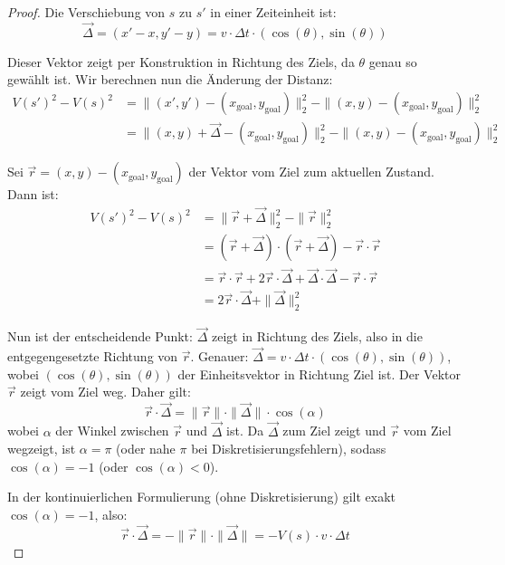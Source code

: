 ﻿\documentclass[a4paper,12pt]{article}
\theoremstyle{definition}
\begin{document}
\begin{proof}
Die Verschiebung von $s$ zu $s'$ in einer Zeiteinheit ist:
\begin{equation}
\vec{\Delta} = (x' - x, y' - y) = v \cdot \Delta t \cdot (\cos(\theta), \sin(\theta))
\end{equation}

Dieser Vektor zeigt per Konstruktion in Richtung des Ziels, da $\theta$ genau so gewählt ist. Wir berechnen nun die Änderung der Distanz:
\begin{align}
V(s')^2 - V(s)^2 &= \|(x', y') - (x_{\text{goal}}, y_{\text{goal}})\|_2^2 - \|(x, y) - (x_{\text{goal}}, y_{\text{goal}})\|_2^2 \\
&= \|(x, y) + \vec{\Delta} - (x_{\text{goal}}, y_{\text{goal}})\|_2^2 - \|(x, y) - (x_{\text{goal}}, y_{\text{goal}})\|_2^2
\end{align}

Sei $\vec{r} = (x, y) - (x_{\text{goal}}, y_{\text{goal}})$ der Vektor vom Ziel zum aktuellen Zustand. Dann ist:
\begin{align}
V(s')^2 - V(s)^2 &= \|\vec{r} + \vec{\Delta}\|_2^2 - \|\vec{r}\|_2^2 \\
&= (\vec{r} + \vec{\Delta}) \cdot (\vec{r} + \vec{\Delta}) - \vec{r} \cdot \vec{r} \\
&= \vec{r} \cdot \vec{r} + 2 \vec{r} \cdot \vec{\Delta} + \vec{\Delta} \cdot \vec{\Delta} - \vec{r} \cdot \vec{r} \\
&= 2 \vec{r} \cdot \vec{\Delta} + \|\vec{\Delta}\|_2^2
\end{align}

Nun ist der entscheidende Punkt: $\vec{\Delta}$ zeigt in Richtung des Ziels, also in die entgegengesetzte Richtung von $\vec{r}$. Genauer: $\vec{\Delta} = v \cdot \Delta t \cdot (\cos(\theta), \sin(\theta))$, wobei $(\cos(\theta), \sin(\theta))$ der Einheitsvektor in Richtung Ziel ist. Der Vektor $\vec{r}$ zeigt vom Ziel weg. Daher gilt:
\begin{equation}
\vec{r} \cdot \vec{\Delta} = \|\vec{r}\| \cdot \|\vec{\Delta}\| \cdot \cos(\alpha)
\end{equation}
wobei $\alpha$ der Winkel zwischen $\vec{r}$ und $\vec{\Delta}$ ist. Da $\vec{\Delta}$ zum Ziel zeigt und $\vec{r}$ vom Ziel wegzeigt, ist $\alpha = \pi$ (oder nahe $\pi$ bei Diskretisierungsfehlern), sodass $\cos(\alpha) = -1$ (oder $\cos(\alpha) < 0$).

In der kontinuierlichen Formulierung (ohne Diskretisierung) gilt exakt $\cos(\alpha) = -1$, also:
\begin{equation}
\vec{r} \cdot \vec{\Delta} = -\|\vec{r}\| \cdot \|\vec{\Delta}\| = -V(s) \cdot v \cdot \Delta t
\end{equation}


\end{proof}
\end{document}
